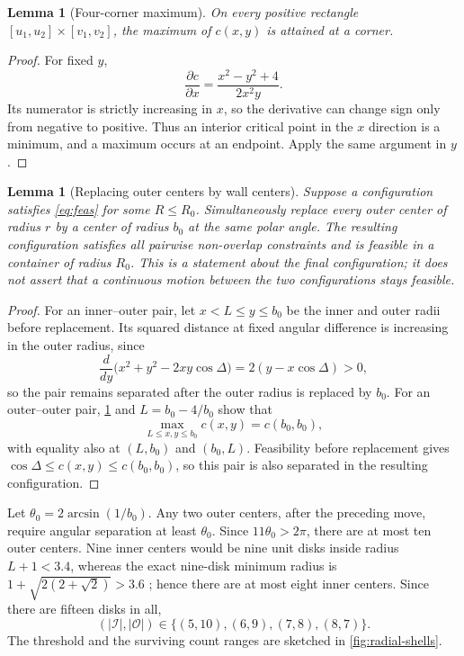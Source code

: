 \documentclass[11pt]{article}
\newtheorem{lemma}[theorem]{Lemma}
\theoremstyle{definition}
\newcommand{\Iset}{\mathcal I}
\newcommand{\Oset}{\mathcal O}
\begin{document}
\begin{lemma}[Four-corner maximum]\label{lem:corners}
On every positive rectangle $[u_1,u_2]\times[v_1,v_2]$, the maximum of $c(x,y)$ is attained at a corner.
\end{lemma}
\begin{proof}
For fixed $y$,
\[
 \frac{\partial c}{\partial x}=\frac{x^2-y^2+4}{2x^2y}.
\]
Its numerator is strictly increasing in $x$, so the derivative can change sign only from negative to positive. Thus an interior critical point in the $x$ direction is a minimum, and a maximum occurs at an endpoint. Apply the same argument in $y$.
\end{proof}
\begin{lemma}[Replacing outer centers by wall centers]\label{lem:push}
Suppose a configuration satisfies \eqref{eq:feas} for some $R\le R_0$. Simultaneously replace every outer center of radius $r$ by a center of radius $b_0$ at the same polar angle. The resulting configuration satisfies all pairwise non-overlap constraints and is feasible in a container of radius $R_0$. This is a statement about the final configuration; it does not assert that a continuous motion between the two configurations stays feasible.
\end{lemma}
\begin{proof}
For an inner--outer pair, let $x<L\le y\le b_0$ be the inner and outer radii before replacement. Its squared distance at fixed angular difference is increasing in the outer radius, since
\[
 \frac{d}{dy}\bigl(x^2+y^2-2xy\cos\Delta\bigr)=2(y-x\cos\Delta)>0,
\]
so the pair remains separated after the outer radius is replaced by $b_0$. For an outer--outer pair, \cref{lem:corners} and $L=b_0-4/b_0$ show that
\[
\max_{L\le x,y\le b_0}c(x,y)=c(b_0,b_0),
\]
with equality also at $(L,b_0)$ and $(b_0,L)$. Feasibility before replacement gives $\cos\Delta\le c(x,y)\le c(b_0,b_0)$, so this pair is also separated in the resulting configuration.
\end{proof}



Let $\theta_0=2\arcsin(1/b_0)$. Any two outer centers, after the preceding move, require angular separation at least $\theta_0$. Since $11\theta_0>2\pi$, there are at most ten outer centers. Nine inner centers would be nine unit disks inside radius $L+1<3.4$, whereas the exact nine-disk minimum radius is $1+\sqrt{2(2+\sqrt2)}>3.6$ \cite{Pirl1969,Packomania}; hence there are at most eight inner centers. Since there are fifteen disks in all,
\begin{equation}\label{eq:counts}
(|\Iset|,|\Oset|)\in\{(5,10),(6,9),(7,8),(8,7)\}.
\end{equation}
The threshold and the surviving count ranges are sketched in \cref{fig:radial-shells}.
\end{document}
